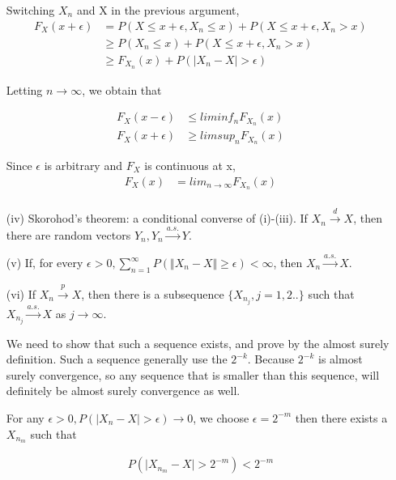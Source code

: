 \documentclass[11pt]{article} %
\begin{document}
\begin{itemize}
Switching $X_n$ and X in the previous argument,
 \begin{align*}
   F_X(x + \epsilon) &= P(X \leq x + \epsilon, X_n \leq x) +  P(X \leq x + \epsilon, X_n > x)  \\
   & \geq P(X_n \leq x) + P(X \leq x + \epsilon, X_n > x) \\
   & \geq F_{X_n}(x) + P(|X_n - X| > \epsilon)
 \end{align*}

Letting $n \rightarrow \infty$, we obtain that

 \begin{align*}
   F_X(x - \epsilon) & \leq lim inf_{n} F_{X_n}(x) \\
   F_X(x + \epsilon) & \geq lim sup_{n} F_{X_n}(x)
 \end{align*}

Since $\epsilon$ is arbitrary and $F_X$ is continuous at x, 
 \begin{align*}
   F_X(x ) & = lim_{n \rightarrow \infty} F_{X_n}(x) \\
 \end{align*}

\item[(iv)] Skorohod's theorem: a conditional converse of (i)-(iii). If $X_n \xrightarrow {d} X$, then there are random vectors $Y_n, Y_n \xrightarrow {a.s.} Y$.

\item[(v)] If, for every $\epsilon > 0, \sum_{n=1}^{\infty} P(\Vert X_n -X \Vert \geq \epsilon) < \infty$, then $X_n \xrightarrow {a.s.} X$. 

\item[(vi)] If $X_n \xrightarrow {p} X$, then there is a subsequence $\{ X_{n_j} , j= 1,2..\}$ such that $X_{n_j} \xrightarrow {a.s.} X$ as $j \rightarrow \infty$.

We need to show that such a sequence exists, and prove by the almost surely definition. Such a sequence generally use the $2^{-k}$. 
Because $2^{-k}$ is almost surely convergence, so any sequence that is smaller than this sequence, will definitely be almost surely convergence as well.

For any $\epsilon > 0, P(\Big | X_n -X \Big | > \epsilon) \rightarrow 0$, we choose $\epsilon = 2^{-m}$ then there exists a $X_{n_m}$ such that

 \begin{align*}
   P(\Big | X_{n_m}- X \Big | > 2^{-m}) < 2^{-m}
 \end{align*}
 

\end{itemize}
\end{document}
